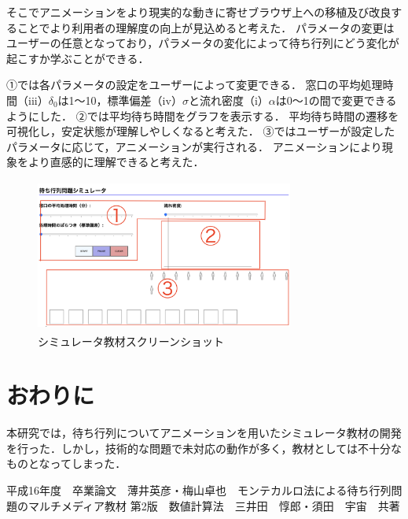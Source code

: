 \documentclass[twocolumn,10pt,a4j]{ltjsarticle}
\begin{document}
そこでアニメーションをより現実的な動きに寄せブラウザ上への移植及び改良することでより利用者の理解度の向上が見込めると考えた．
パラメータの変更はユーザーの任意となっており，パラメータの変化によって待ち行列にどう変化が起こすか学ぶことができる．

①では各パラメータの設定をユーザーによって変更できる．
窓口の平均処理時間（iii）$\delta_0$は1〜10，標準偏差（iv）$\sigma$と流れ密度（i）$\alpha$は0〜1の間で変更できるようにした．
②では平均待ち時間をグラフを表示する．
平均待ち時間の遷移を可視化し，安定状態が理解しやしくなると考えた．
③ではユーザーが設定したパラメータに応じて，アニメーションが実行される．
アニメーションにより現象をより直感的に理解できると考えた．

\begin{figure}[h]
\begin{center}
\includegraphics[clip,width=85mm,height=50mm]{figures/layout_ex.pdf}
\end{center}
\caption{シミュレータ教材スクリーンショット}
\label{fig:教科書}
\end{figure}

\section{おわりに}
本研究では，待ち行列についてアニメーションを用いたシミュレータ教材の開発を行った．しかし，技術的な問題で未対応の動作が多く，教材としては不十分なものとなってしまった．

\begin{thebibliography}{99}
平成16年度　卒業論文　薄井英彦・梅山卓也　モンテカルロ法による待ち行列問題のマルチメディア教材
 第2版　数値計算法　三井田　惇郎・須田　宇宙　共著
\end{thebibliography}
\end{document}
